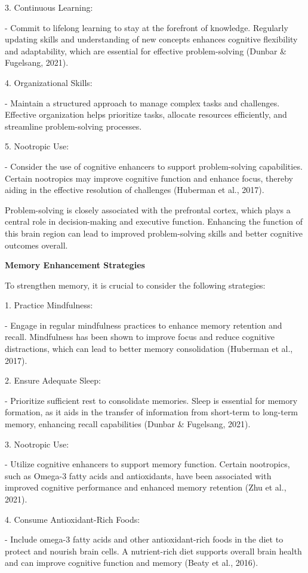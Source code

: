 \documentclass[
]{article}
\begin{document}
3. Continuous Learning:

- Commit to lifelong learning to stay at the forefront of knowledge.
Regularly updating skills and understanding of new concepts enhances
cognitive flexibility and adaptability, which are essential for
effective problem-solving (Dunbar \& Fugelsang, 2021).

4. Organizational Skills:

- Maintain a structured approach to manage complex tasks and challenges.
Effective organization helps prioritize tasks, allocate resources
efficiently, and streamline problem-solving processes.

5. Nootropic Use:

- Consider the use of cognitive enhancers to support problem-solving
capabilities. Certain nootropics may improve cognitive function and
enhance focus, thereby aiding in the effective resolution of challenges
(Huberman et al., 2017).

Problem-solving is closely associated with the prefrontal cortex, which
plays a central role in decision-making and executive function.
Enhancing the function of this brain region can lead to improved
problem-solving skills and better cognitive outcomes overall.

\textbf{Memory Enhancement Strategies}

To strengthen memory, it is crucial to consider the following
strategies:

1. Practice Mindfulness:

- Engage in regular mindfulness practices to enhance memory retention
and recall. Mindfulness has been shown to improve focus and reduce
cognitive distractions, which can lead to better memory consolidation
(Huberman et al., 2017).

2. Ensure Adequate Sleep:

- Prioritize sufficient rest to consolidate memories. Sleep is essential
for memory formation, as it aids in the transfer of information from
short-term to long-term memory, enhancing recall capabilities (Dunbar \&
Fugelsang, 2021).

3. Nootropic Use:

- Utilize cognitive enhancers to support memory function. Certain
nootropics, such as Omega-3 fatty acids and antioxidants, have been
associated with improved cognitive performance and enhanced memory
retention (Zhu et al., 2021).

4. Consume Antioxidant-Rich Foods:

- Include omega-3 fatty acids and other antioxidant-rich foods in the
diet to protect and nourish brain cells. A nutrient-rich diet supports
overall brain health and can improve cognitive function and memory
(Beaty et al., 2016).
\end{document}
